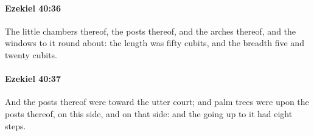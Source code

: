 		\paragraph{Ezekiel 40:36} %
			\label{EZEKIEL-40-36}

			The little chambers thereof, the posts thereof, and the arches thereof, and the windows to it round about: the length was fifty cubits, and the breadth five and twenty cubits.


		\paragraph{Ezekiel 40:37} %
			\label{EZEKIEL-40-37}

			And the posts thereof were toward the utter court; and palm trees were upon the posts thereof, on this side, and on that side: and the going up to it had eight steps.


